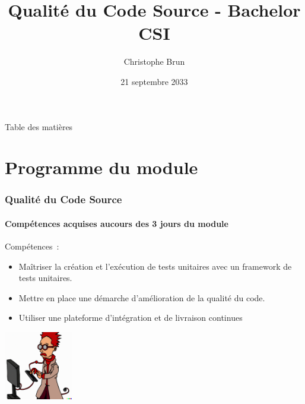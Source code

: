 \documentclass{beamer}
\title{Qualité du Code Source - Bachelor CSI}
\author{Christophe Brun}
\institute{Campus Saint-Michel IT}
\date{21 septembre 2033}
\begin{document}
    \begin{frame}
        \transdissolve
        \titlepage
    \end{frame}

    \begin{frame}{Table des matières}
        \tableofcontents
    \end{frame}


    \section{Programme du module}
    \begin{frame}
        \frametitle{Qualité du Code Source}
        \framesubtitle{Compétences acquises aucours des 3 jours du module}
        \transdissolve
        Compétences~:
        \begin{itemize}
            \item Maîtriser la création et l’exécution de tests unitaires avec un framework de tests unitaires.
            \item Mettre en place une démarche d’amélioration de la qualité du code.
            \item Utiliser une plateforme d’intégration et de livraison continues

        \end{itemize}
        \centering
        \includegraphics[width=3cm]{image/funny-cartoon-of-a-smart-young-computer-scientist.png}
    \end{frame}
\end{document}
